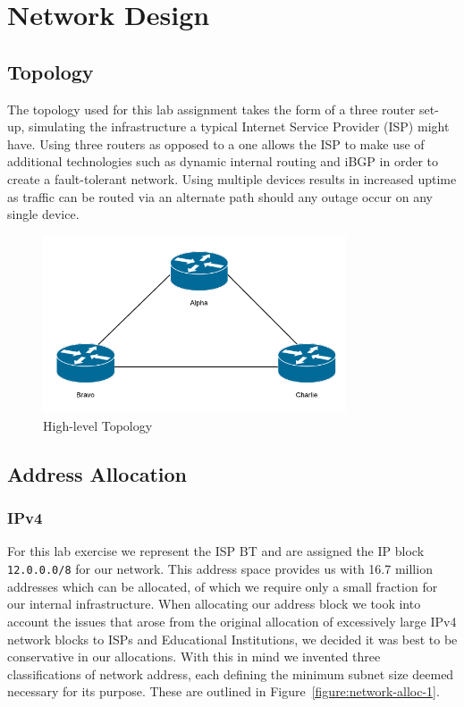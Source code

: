 \chapter{Network Design}

\section{Topology}

The topology used for this lab assignment takes the form of a three router set-
up, simulating the infrastructure a typical Internet Service Provider (ISP)
might have. Using three routers as opposed to a one allows the ISP to make use
of additional technologies such as dynamic internal routing and iBGP in order
to create a fault-tolerant network. Using multiple devices results in increased
uptime as traffic can be routed via an alternate path should any outage occur
on any single device.

\begin{figure}[!ht]
    \caption{High-level Topology}
    \centering
    \includegraphics[width=0.8\textwidth]{images/networkTopology.png}
\end{figure}

\section{Address Allocation}
\subsection{IPv4}
For this lab exercise we represent the ISP BT and are assigned the IP block
\texttt{12.0.0.0/8} for our network. This address space provides us with 16.7
million addresses which can be allocated, of which we require only a small
fraction for our internal infrastructure. When allocating our address block we
took into account the issues that arose from the original allocation of
excessively large IPv4 network blocks to ISPs and Educational Institutions, we
decided it was best to be conservative in our allocations. With this in mind we
invented three classifications of network address, each defining the minimum
subnet size deemed necessary for its purpose. These are outlined in
Figure~\ref{figure:network-alloc-1}.

